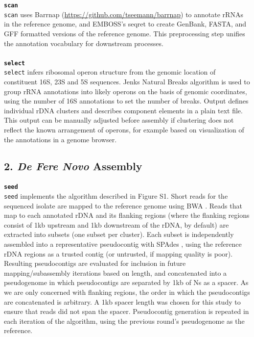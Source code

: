 \documentclass[a4,center,fleqn]{NAR}
\begin{document}
\textbf{\texttt{scan}}\\
\texttt{scan} uses Barrnap (\url{https://github.com/tseemann/barrnap}) to annotate rRNAs in the reference genome, and EMBOSS's seqret \cite{Rice2000a} to create GenBank, FASTA, and GFF formatted versions of the reference genome. This preprocessing step unifies the annotation vocabulary for downstream processes.\\
\\
\textbf{\texttt{select}}\\
\texttt{select} infers ribosomal operon structure from the genomic location of constituent 16S, 23S and 5S sequences. Jenks Natural Breaks algorithm is used to group rRNA annotations into likely operons on the basis of genomic coordinates, using the number of 16S annotations to set the number of breaks. Output defines individual rDNA clusters and describes component elements in a plain text file. This output can be manually adjusted before assembly if clustering does not reflect the known arrangement of operons, for example based on visualization of the annotations in a genome browser.

\subsection*{2. \textit{De Fere Novo} Assembly}

\textbf{\texttt{seed}}\\
\texttt{seed} implements the algorithm described in Figure S1. Short reads for the sequenced isolate are mapped to the reference genome using BWA \cite{Li2009}. Reads that map to each annotated rDNA and its flanking regions (where the flanking regions consist of 1kb upstream and 1kb downstream of the rDNA, by default) are extracted into subsets (one subset per cluster). Each subset is independently assembled into a representative pseudocontig with SPAdes \cite{Bankevich2012}, using the reference rDNA regions as a trusted contig (or untrusted, if mapping quality is poor). Resulting pseudocontigs are evaluated for inclusion in future mapping/subassembly iterations based on length, and concatenated into a pseudogenome in which pseudocontigs are separated by 1kb of Ns as a spacer. As we are only concerned with flanking regions, the order in which the pseudocontigs are concatenated is arbitrary. A 1kb spacer length was chosen for this study to ensure that reads did not span the spacer. Pseudocontig generation is repeated in each iteration of the algorithm, using the previous round's pseudogenome as the reference.
\end{document}
